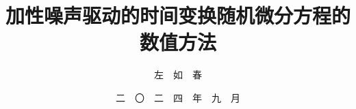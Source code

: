 \documentclass[master]{shnuthesis}
\title{加性噪声驱动的时间变换随机微分方程的数值方法}
\author{左~~如~~春}   %
\date{二~~〇~~二~~四~~年~~九~~月 }  %
\institute{数~~理~~学~~院}  %
\begin{document}
\maketitle

\makestatement


\frontmatter






\maketoc




%


\mainmatter

















%


%



\backmatter %

%


\end{document}
